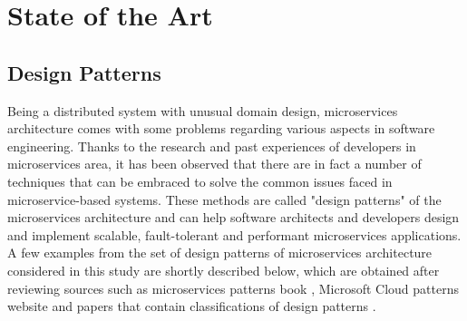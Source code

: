 \documentclass[11pt,a4paper,twocolumn]{article}
\begin{document}

\section{State of the Art}
\label{sec:State of the Art}


\subsection{Design Patterns}
\label{subsec:patterns}

Being a distributed system with unusual domain design, microservices architecture comes with some problems regarding various aspects in software engineering.
Thanks to the research and past experiences of developers in microservices area, it has been observed that there are in fact a number of techniques that can be embraced to solve the common issues faced in microservice-based systems.
These methods are called "design patterns" of the microservices architecture and can help software architects and developers design and implement scalable, fault-tolerant and performant microservices applications.
A few examples from the set of design patterns of microservices architecture considered in this study are shortly described below, which are obtained after reviewing sources such as microservices patterns book \cite{richardson_book}, Microsoft Cloud patterns website \cite{microsoft_docs} and papers that contain classifications of design patterns \cite{TaibiD2018APfM}\cite{KARABEYAKSAKALLI2021111014}\cite{valdivia}\cite{10.1145/3241403.3241429}\cite{8719492}\cite{9105640}.\\
\end{document}
